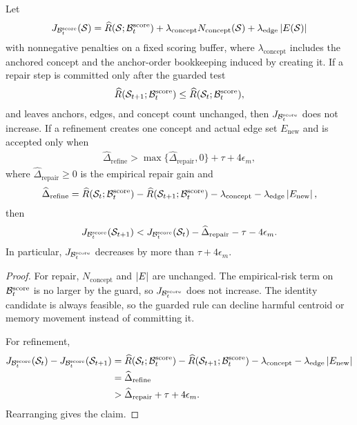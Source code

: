 \begin{theorem}
\label{thm:refine-repair-descent:formal}
Let
\begin{align*}
J_{\mathcal{B}_t^{\mathrm{score}}}(\mathcal{S})
=
\widehat R(\mathcal{S};\mathcal{B}_t^{\mathrm{score}})
+\lambda_{\mathrm{concept}}N_{\mathrm{concept}}(\mathcal{S})
+\lambda_{\mathrm{edge}}\left\lvert E(\mathcal{S})\right\rvert
\end{align*}
with nonnegative penalties on a fixed scoring buffer, where $\lambda_{\mathrm{concept}}$ includes the anchored concept and the anchor-order bookkeeping induced by creating it. If a repair step is committed only after the guarded test
\begin{align*}
\widehat R(\mathcal{S}_{t+1};\mathcal{B}_t^{\mathrm{score}})
\le
\widehat R(\mathcal{S}_t;\mathcal{B}_t^{\mathrm{score}}),
\end{align*}
and leaves anchors, edges, and concept count unchanged, then $J_{\mathcal{B}_t^{\mathrm{score}}}$ does not increase. If a refinement creates one concept and actual edge set $E_{\mathrm{new}}$ and is accepted only when
\begin{align*}
\widehat\Delta_{\mathrm{refine}}>
\max\{\widehat\Delta_{\mathrm{repair}},0\}+\tau+4\epsilon_m,
\end{align*}
where $\widehat\Delta_{\mathrm{repair}}\ge0$ is the empirical repair gain and
\begin{align*}
\widehat\Delta_{\mathrm{refine}}
=
\widehat R(\mathcal{S}_t;\mathcal{B}_t^{\mathrm{score}})
-
\widehat R(\mathcal{S}_{t+1};\mathcal{B}_t^{\mathrm{score}})
-
\lambda_{\mathrm{concept}}
-
\lambda_{\mathrm{edge}}\left\lvert E_{\mathrm{new}}\right\rvert,
\end{align*}
then
\begin{align*}
J_{\mathcal{B}_t^{\mathrm{score}}}(\mathcal{S}_{t+1})
<
J_{\mathcal{B}_t^{\mathrm{score}}}(\mathcal{S}_t)
-\widehat\Delta_{\mathrm{repair}}
-\tau-4\epsilon_m.
\end{align*}
In particular, $J_{\mathcal{B}_t^{\mathrm{score}}}$ decreases by more than $\tau+4\epsilon_m$.
\end{theorem}
\begin{proof}
For repair, $N_{\mathrm{concept}}$ and $\left\lvert E\right\rvert$ are unchanged. The empirical-risk term on $\mathcal{B}_t^{\mathrm{score}}$ is no larger by the guard, so $J_{\mathcal{B}_t^{\mathrm{score}}}$ does not increase. The identity candidate is always feasible, so the guarded rule can decline harmful centroid or memory movement instead of committing it.

For refinement,
\begin{align*}
J_{\mathcal{B}_t^{\mathrm{score}}}(\mathcal{S}_t)-J_{\mathcal{B}_t^{\mathrm{score}}}(\mathcal{S}_{t+1})
&=\widehat R(\mathcal{S}_t;\mathcal{B}_t^{\mathrm{score}})
-\widehat R(\mathcal{S}_{t+1};\mathcal{B}_t^{\mathrm{score}})
-\lambda_{\mathrm{concept}}-\lambda_{\mathrm{edge}}\left\lvert E_{\mathrm{new}}\right\rvert\\
&=\widehat\Delta_{\mathrm{refine}}\\
&>\widehat\Delta_{\mathrm{repair}}+\tau+4\epsilon_m.
\end{align*}
Rearranging gives the claim.
\end{proof}

